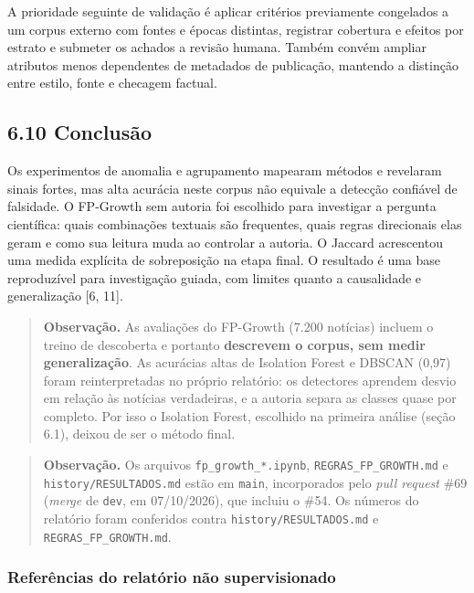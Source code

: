 \documentclass[
  brazilian,
  11pt,
]{article}
\begin{document}
A prioridade seguinte de validação é aplicar critérios previamente congelados a um corpus externo com fontes e épocas distintas, registrar cobertura e efeitos por estrato e submeter os achados a revisão humana. Também convém ampliar atributos menos dependentes de metadados de publicação, mantendo a distinção entre estilo, fonte e checagem factual.

\subsection{6.10 Conclusão}\label{conclusuxe3o}

Os experimentos de anomalia e agrupamento mapearam métodos e revelaram sinais fortes, mas alta acurácia neste corpus não equivale a detecção confiável de falsidade. O FP-Growth sem autoria foi escolhido para investigar a pergunta científica: quais combinações textuais são frequentes, quais regras direcionais elas geram e como sua leitura muda ao controlar a autoria. O Jaccard acrescentou uma medida explícita de sobreposição na etapa final. O resultado é uma base reproduzível para investigação guiada, com limites quanto a causalidade e generalização {[}6, 11{]}.

\begin{quote}
\textbf{Observação.} As avaliações do FP-Growth (7.200 notícias) incluem o treino de descoberta e portanto \textbf{descrevem o corpus, sem medir generalização}. As acurácias altas de Isolation Forest e DBSCAN (0,97) foram reinterpretadas no próprio relatório: os detectores aprendem desvio em relação às notícias verdadeiras, e a autoria separa as classes quase por completo. Por isso o Isolation Forest, escolhido na primeira análise (seção 6.1), deixou de ser o método final.
\end{quote}

\begin{quote}
\textbf{Observação.} Os arquivos \texttt{fp\_growth\_*.ipynb}, \texttt{REGRAS\_FP\_GROWTH.md} e \texttt{history/RESULTADOS.md} estão em \texttt{main}, incorporados pelo \emph{pull request} \#69 (\emph{merge} de \texttt{dev}, em 07/10/2026), que incluiu o \#54. Os números do relatório foram conferidos contra \texttt{history/RESULTADOS.md} e \texttt{REGRAS\_FP\_GROWTH.md}.
\end{quote}

\subsubsection{Referências do relatório não supervisionado}\label{referuxeancias-do-relatuxf3rio-nuxe3o-supervisionado}
\end{document}
